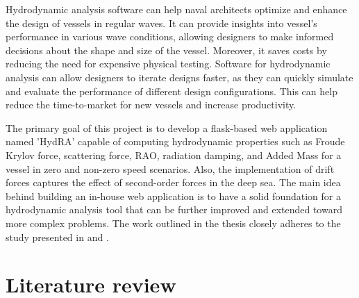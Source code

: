 Hydrodynamic analysis software can help naval architects optimize and enhance the design of 
vessels in regular waves. It can provide insights into vessel's performance in various 
wave conditions, 
allowing designers to make informed decisions about the shape and size of the vessel. 
Moreover, it saves costs by reducing the need for expensive physical testing.
Software for hydrodynamic analysis can allow designers to iterate designs faster, 
as they can quickly simulate and evaluate the performance of different design configurations. 
This can help reduce the time-to-market for new vessels and increase productivity.

The primary goal of this project is to develop a flask-based web application named 'HydRA' 
capable of computing hydrodynamic properties such as Froude Krylov force, scattering force, 
RAO, radiation damping, and Added Mass for a vessel in zero and non-zero speed scenarios.
Also, the implementation of drift forces captures the effect of second-order forces in 
the deep sea. The main idea behind building an in-house web application is to have a 
solid foundation for a hydrodynamic analysis tool that can be further improved and 
extended toward more complex problems. The work outlined in the thesis 
closely adheres to the study presented in \citet{guha2015estimation} 
and \cite{guha2012development}.

\section{Literature review}


